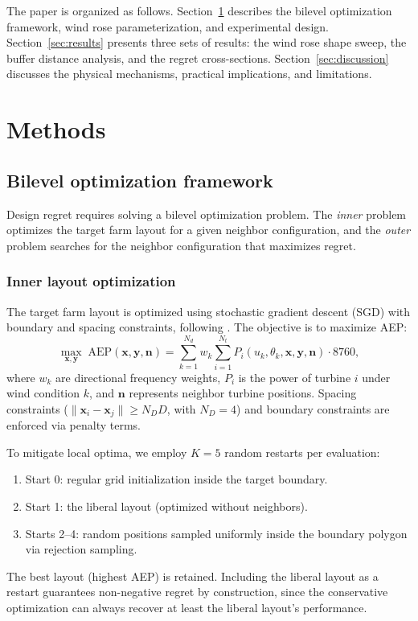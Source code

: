\documentclass[manuscript, 12pt]{copernicus}
\begin{document}
The paper is organized as follows.
Section~\ref{sec:methods} describes the bilevel optimization framework, wind rose parameterization, and experimental design.
Section~\ref{sec:results} presents three sets of results: the wind rose shape sweep, the buffer distance analysis, and the regret cross-sections.
Section~\ref{sec:discussion} discusses the physical mechanisms, practical implications, and limitations.

\section{Methods}\label{sec:methods}

\subsection{Bilevel optimization framework}

Design regret requires solving a bilevel optimization problem.
The \emph{inner} problem optimizes the target farm layout for a given neighbor configuration, and the \emph{outer} problem searches for the neighbor configuration that maximizes regret.

\subsubsection{Inner layout optimization}

The target farm layout is optimized using stochastic gradient descent (SGD) with boundary and spacing constraints, following \citet{Quick2023sgd}.
The objective is to maximize AEP:
\begin{equation}
    \max_{\mathbf{x}, \mathbf{y}} \; \text{AEP}(\mathbf{x}, \mathbf{y}, \mathbf{n}) = \sum_{k=1}^{N_d} w_k \sum_{i=1}^{N_t} P_i(u_k, \theta_k, \mathbf{x}, \mathbf{y}, \mathbf{n}) \cdot 8760,
\end{equation}
where $w_k$ are directional frequency weights, $P_i$ is the power of turbine $i$ under wind condition $k$, and $\mathbf{n}$ represents neighbor turbine positions.
Spacing constraints ($\|\mathbf{x}_i - \mathbf{x}_j\| \geq N_D D$, with $N_D = 4$) and boundary constraints are enforced via penalty terms.

To mitigate local optima, we employ $K = 5$ random restarts per evaluation:
\begin{enumerate}
    \item Start 0: regular grid initialization inside the target boundary.
    \item Start 1: the liberal layout (optimized without neighbors).
    \item Starts 2--4: random positions sampled uniformly inside the boundary polygon via rejection sampling.
\end{enumerate}
The best layout (highest AEP) is retained.
Including the liberal layout as a restart guarantees non-negative regret by construction, since the conservative optimization can always recover at least the liberal layout's performance.
\end{document}
